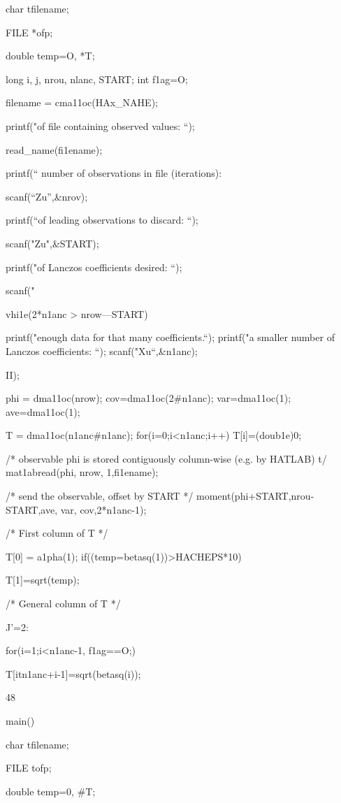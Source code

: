 {

char tfilename;

FILE *ofp;

double temp=O, *T;

long i, j, nrou, nlanc, START;
int f1ag=O;

filename = cma11oc(HAx_NAHE);

printf("\nName of file containing observed values: “);

read_name(fi1ename);

printf(“ number of observations in file (iterations):

scanf(“Zu”,&nrov);

printf(“\nNumber of leading observations to discard: “);

scanf("Zu",&START);

printf("\nNumber of Lanczos coefficients desired: “);

scanf("%

vhi1e(2*n1anc > nrow—START)

{
printf("\nNot enough data for that many coefficients.\n“);
printf("\nEnter a smaller number of Lanczos coefficients: “);
scanf("Xu“,&n1anc);

}

II);

phi = dma11oc(nrow);
cov=dma11oc(2#n1anc);
var=dma11oc(1);
ave=dma11oc(1);

T = dma11oc(n1anc#n1anc); for(i=0;i<n1anc;i++) T[i]=(doub1e)0;

/* observable phi is stored contiguously column-wise (e.g. by HATLAB) t/
mat1abread(phi, nrow, 1,fi1ename);

/* send the observable, offset by START */
moment(phi+START,nrou-START,ave, var, cov,2*n1anc-1);

/* First column of T */

T[0] = a1pha(1);
if((temp=betasq(1))>HACHEPS*10)
{

T[1]=sqrt(temp);

/* General column of T */

J'=2:

for(i=1;i<n1anc-1, f1ag==O;)
{

T[itn1anc+i-1]=sqrt(betasq(i));

48

main()

{

char tfilename;

FILE tofp;

double temp=0, #T;

}}}}
